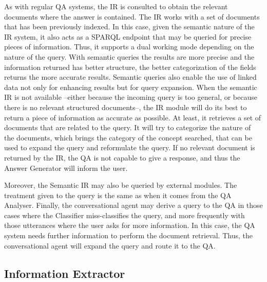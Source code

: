 As with regular \ac{QA} systems, the \ac{IR} is consulted to obtain the relevant documents where the answer is contained. The \ac{IR} works with a set of documents that has been previously indexed.
In this case, given the semantic nature of the \ac{IR} system, it also acts as a \ac{SPARQL} endpoint that may be queried for precise pieces of information. Thus, it supports a dual working mode depending on the nature of the query.
With semantic queries the results are more precise and the information returned has better structure, the better categorization of the fields returns the more accurate results. 
Semantic queries also enable the use of linked data not only for enhancing results but for query expansion.
When the semantic \ac{IR} is not available --either because the incoming query is too general, or because there is no relevant structured documents--, the \ac{IR} module will do its best to return a piece of information as accurate as possible. At least, it retrieves a set of documents that are related to the query. It will try to categorize the nature of the documents, which brings the category of the concept searched, that can be used to expand the query and reformulate the query.
If no relevant document is returned by the \ac{IR}, the \ac{QA} is not capable to give a response, and thus the Answer Generator will inform the user. 

Moreover, the Semantic \ac{IR} may also be queried by external modules. The treatment given to the query is the same as when it comes from the QA Analyser.
Finally, the conversational agent may derive a query to the \ac{QA} in those cases where the Classifier miss-classifies the query, and more frequently with those utterances where the user	 asks for more information. In this case, the \ac{QA} system needs further information to perform the document retrieval. Thus, the conversational agent will expand the query and route it to the \ac{QA}.


\subsection{Information Extractor}

